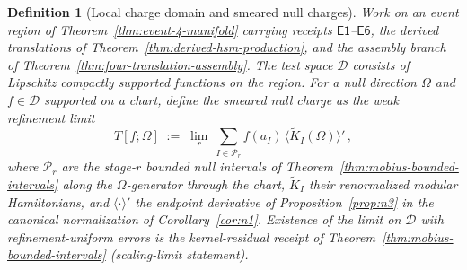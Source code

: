 \documentclass[11pt]{article}
\newtheorem{definition}[theorem]{Definition}
\begin{document}
\begin{definition}[Local charge domain and smeared null charges]
\label{def:local-charge-domain}
Work on an event region of Theorem~\ref{thm:event-4-manifold} carrying
receipts \(\mathsf{E1}\)--\(\mathsf{E6}\), the derived translations of
Theorem~\ref{thm:derived-hsm-production}, and the assembly branch of
Theorem~\ref{thm:four-translation-assembly}. The test space
\(\mathcal D\) consists of Lipschitz compactly supported functions on the
region. For a null direction \(\Omega\) and \(f\in\mathcal D\) supported on a
chart, define the smeared null charge as the weak refinement limit
\[
T[f;\Omega]\;:=\;\lim_r\ \sum_{I\in\mathcal P_r}
f(a_I)\,\bigl\langle \widetilde K_{I}(\Omega)\bigr\rangle'\, ,
\]
where \(\mathcal P_r\) are the stage-\(r\) bounded null intervals of
Theorem~\ref{thm:mobius-bounded-intervals} along the \(\Omega\)-generator
through the chart, \(\widetilde K_I\) their renormalized modular
Hamiltonians, and \(\langle\cdot\rangle'\) the endpoint derivative of
Proposition~\ref{prop:n3} in the canonical normalization of
Corollary~\ref{cor:n1}. Existence of the limit on \(\mathcal D\) with
refinement-uniform errors is the kernel-residual receipt of
Theorem~\ref{thm:mobius-bounded-intervals} (scaling-limit statement).
\end{definition}
\end{document}
